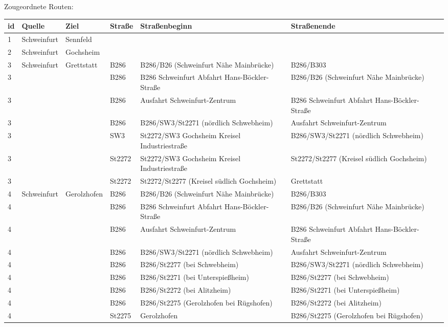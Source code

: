 Zougeordnete Routen:
\newline
\newline
\begin{tabular}{|l|l|l|l|l|l|l|}
    \hline
    id & Quelle & Ziel & Straße & Straßenbeginn & Straßenende\\ 
    \hline
    1 & Schweinfurt & Sennfeld &  &  & \\ 
    \hline
    2 & Schweinfurt & Gochsheim &  &  & \\ 
    \hline
    3 & Schweinfurt & Grettstatt & B286 & B286/B26 (Schweinfurt Nähe Mainbrücke) & B286/B303\\ 
    3 &  &  & B286 & B286 Schweinfurt Abfahrt Hans-Böckler-Straße & B286/B26 (Schweinfurt Nähe Mainbrücke)\\ 
    3 &  &  & B286 & Ausfahrt Schweinfurt-Zentrum & B286 Schweinfurt Abfahrt Hans-Böckler-Straße\\ 
    3 &  &  & B286 & B286/SW3/St2271 (nördlich Schwebheim) & Ausfahrt Schweinfurt-Zentrum\\ 
    3 &  &  & SW3 & St2272/SW3 Gochsheim Kreisel Industriestraße & B286/SW3/St2271 (nördlich Schwebheim)\\ 
    3 &  &  & St2272 & St2272/SW3 Gochsheim Kreisel Industriestraße & St2272/St2277 (Kreisel südlich Gochsheim)\\ 
    3 &  &  & St2272 & St2272/St2277 (Kreisel südlich Gochsheim) & Grettstatt\\ 
    \hline
    4 & Schweinfurt & Gerolzhofen & B286 & B286/B26 (Schweinfurt Nähe Mainbrücke) & B286/B303\\ 
    4 &  &  & B286 & B286 Schweinfurt Abfahrt Hans-Böckler-Straße & B286/B26 (Schweinfurt Nähe Mainbrücke)\\ 
    4 &  &  & B286 & Ausfahrt Schweinfurt-Zentrum & B286 Schweinfurt Abfahrt Hans-Böckler-Straße\\ 
    4 &  &  & B286 & B286/SW3/St2271 (nördlich Schwebheim) & Ausfahrt Schweinfurt-Zentrum\\ 
    4 &  &  & B286 & B286/St2277 (bei Schwebheim) & B286/SW3/St2271 (nördlich Schwebheim)\\ 
    4 &  &  & B286 & B286/St2271 (bei Unterspießheim) & B286/St2277 (bei Schwebheim)\\ 
    4 &  &  & B286 & B286/St2272 (bei Alitzheim) & B286/St2271 (bei Unterspießheim)\\ 
    4 &  &  & B286 & B286/St2275 (Gerolzhofen bei Rügshofen) & B286/St2272 (bei Alitzheim)\\ 
    4 &  &  & St2275 & Gerolzhofen & B286/St2275 (Gerolzhofen bei Rügshofen)\\ 

\end{tabular}
